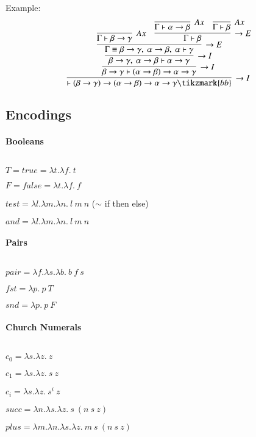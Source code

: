 \documentclass[9pt]{article}
\begin{document}
Example:
\[
    \infer[\to I]{\vdash(\beta \to \gamma)\to (\alpha \to \beta) \to \alpha \to \gamma\tikzmark{bb}}{
        \infer[\to I]{\beta\to\gamma \vdash (\alpha \to \beta) \to \alpha \to \gamma}{
            \infer[\to I]{\beta\to\gamma,\ \alpha\to\beta \vdash \alpha \to \gamma}{
                \infer[\to E]{\Gamma\equiv \beta\to\gamma,\ \alpha\to\beta,\ \alpha \vdash \gamma}{
                    \infer[Ax]{\Gamma \vdash \beta\to\gamma}{}
                    & \infer[\to E]{ \Gamma \vdash \beta}{
                        \infer[Ax]{\Gamma \vdash \alpha \to \beta}{}
                        & \infer[Ax]{\Gamma \vdash \beta}{}}}}}}
\]

\subsection{Encodings}

\paragraph*{Booleans}$ $

$T = true = \lambda t . \lambda f .\ t$

$F = false = \lambda t . \lambda f .\ f$

$test = \lambda l . \lambda m . \lambda n .\ l\ m\ n$ ($\sim$ if then else)

$and = \lambda l . \lambda m . \lambda n .\ l\ m\ n$


\paragraph*{Pairs}$ $

$pair = \lambda f . \lambda s . \lambda b.\ b\ f\ s$

$fst = \lambda p .\ p\ T$

$snd = \lambda p .\ p\ F$

\paragraph*{Church Numerals}$ $

$c_0 = \lambda s.\lambda z.\ z$

$c_1 = \lambda s.\lambda z.\ s\ z$

$c_i = \lambda s.\lambda z.\ s^{i}\ z$

$succ = \lambda n . \lambda s . \lambda z.\ s\ (n\ s\ z)$

$plus = \lambda m .\lambda n . \lambda s . \lambda z.\ m\ s\ (n\ s\ z)$
\end{document}
